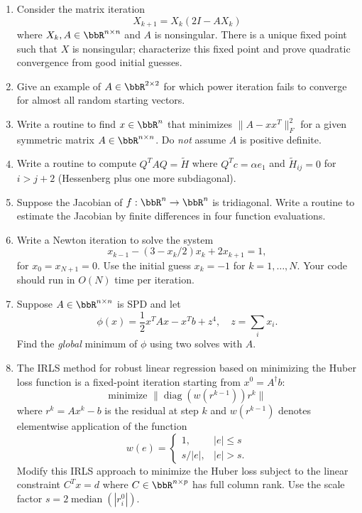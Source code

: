 \documentclass[12pt, leqno]{article}
\begin{document}
\begin{enumerate}
\item
  Consider the matrix iteration
  \[
    X_{k+1} = X_k (2I-A X_k)
  \]
  where $X_k, A \in \bbR^{n \times n}$ and $A$ is nonsingular.  
  There is a unique
  fixed point such that $X$ is nonsingular; characterize this
  fixed point and prove quadratic convergence from good initial
  guesses.

\item
  Give an example of $A \in \bbR^{2 \times 2}$ for which power iteration fails
  to converge for almost all random starting vectors.

\item
  Write a routine to find $x \in \bbR^n$ that minimizes $\|A-xx^T\|_F^2$
  for a given symmetric matrix $A \in \bbR^{n \times n}$.
  Do {\em not} assume $A$ is positive definite.

\item
  Write a routine to compute $Q^T A Q = \tilde{H}$ where
  $Q^T c = \alpha e_1$ and $\tilde{H}_{ij} = 0$ for $i > j+2$
  (Hessenberg plus one more subdiagonal).

\item
  Suppose the Jacobian of $f : \bbR^n \rightarrow \bbR^n$ is
  tridiagonal.  Write a routine to estimate the Jacobian by
  finite differences in four function evaluations.

\item
  Write a Newton iteration to solve the system
  \[
    x_{k-1} - (3-x_k/2) x_k + 2 x_{k+1} = 1,
  \]
  for $x_0 = x_{N+1} = 0$.  Use the initial guess $x_k = -1$ for $k=1,
  \ldots, N$.  Your code should run in $O(N)$ time per iteration.

\item
  Suppose $A \in \bbR^{n \times n}$ is SPD and let
  \[
    \phi(x) = \frac{1}{2} x^T A x - x^T b + z^4, \quad
    z = \sum_i x_i.
  \]
  Find the {\em global} minimum of $\phi$ using two solves with $A$.

\item
  The IRLS method for robust linear regression based on minimizing the
  Huber loss function is a fixed-point iteration starting from
  $x^0 = A^\dagger b$:
  \[
    \mbox{minimize } \|\operatorname{diag}(w(r^{k-1})) r^k\|
  \]
  where $r^k = Ax^k-b$ is the residual at step $k$ and $w(r^{k-1})$
  denotes elementwise application of the function
  \[
    w(e) = \begin{cases} 1, & |e| \leq s \\ s/|e|, & |e| > s. \end{cases}
  \]
  Modify this IRLS approach to minimize the Huber loss subject to the
  linear constraint $C^T x = d$ where $C \in \bbR^{n \times p}$ has
  full column rank.  Use the scale factor
  $s = 2 \operatorname{median}(|r_i^0|)$.
    
\end{enumerate}
\end{document}
